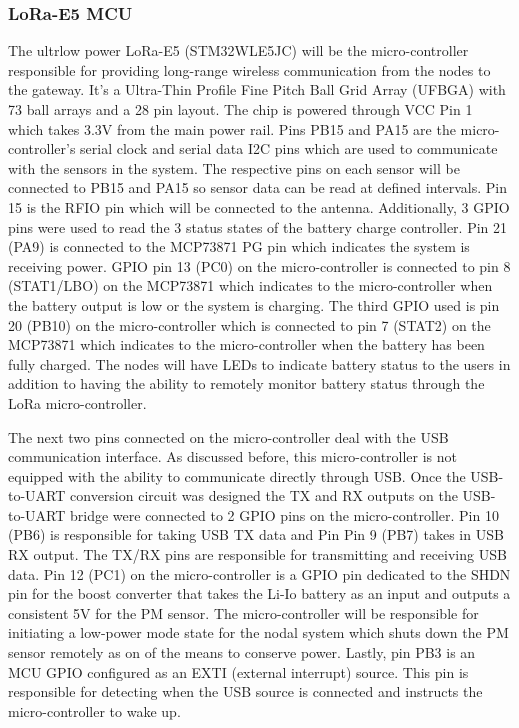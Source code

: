 \subsubsection{LoRa-E5 MCU}
The ultrlow power LoRa-E5 (STM32WLE5JC) will be the micro-controller responsible for providing long-range wireless communication from the nodes to the gateway. It's a Ultra-Thin Profile Fine Pitch Ball Grid Array (UFBGA) with 73 ball arrays and a 28 pin layout. The chip is powered through VCC Pin 1 which takes 3.3V from the main power rail. Pins PB15 and PA15 are the micro-controller's serial clock and serial data I2C pins which are used to communicate with the sensors in the system. The respective pins on each sensor will be connected to PB15 and PA15 so sensor data can be read at defined intervals. Pin 15 is the RFIO pin which will be connected to the antenna. Additionally, 3 GPIO pins were used to read the 3 status states of the battery charge controller. Pin 21 (PA9) is connected to the MCP73871 PG pin which indicates the system is receiving power. GPIO pin 13 (PC0) on the micro-controller is connected to pin 8 (STAT1/LBO) on the MCP73871 which indicates to the micro-controller when the battery output is low or the system is charging. The third GPIO used is pin 20 (PB10) on the micro-controller which is connected to pin 7 (STAT2) on the MCP73871 which indicates to the micro-controller when the battery has been fully  charged. The nodes will have LEDs to indicate battery status to the users in addition to having the ability to remotely monitor battery status through the LoRa micro-controller. 

The next two pins connected on the micro-controller deal with the USB communication interface. As discussed before, this micro-controller is not equipped with the ability to communicate directly through USB. Once the USB-to-UART conversion circuit was designed the TX and RX outputs on the USB-to-UART bridge were connected to 2 GPIO pins on the micro-controller. Pin 10 (PB6) is responsible for taking USB TX data and Pin Pin 9 (PB7) takes in USB RX output. The TX/RX pins are responsible for transmitting and receiving USB data. Pin 12 (PC1) on the micro-controller is a GPIO pin dedicated to the SHDN pin for the boost converter that takes the Li-Io battery as an input and outputs a consistent 5V for the PM sensor. The micro-controller will be responsible for initiating a low-power mode state for the nodal system which shuts down the PM sensor remotely as on of the means to conserve power. Lastly, pin PB3 is an MCU GPIO configured as an EXTI (external interrupt) source. This pin is responsible for detecting when the USB source is connected and instructs the micro-controller to wake up. 
